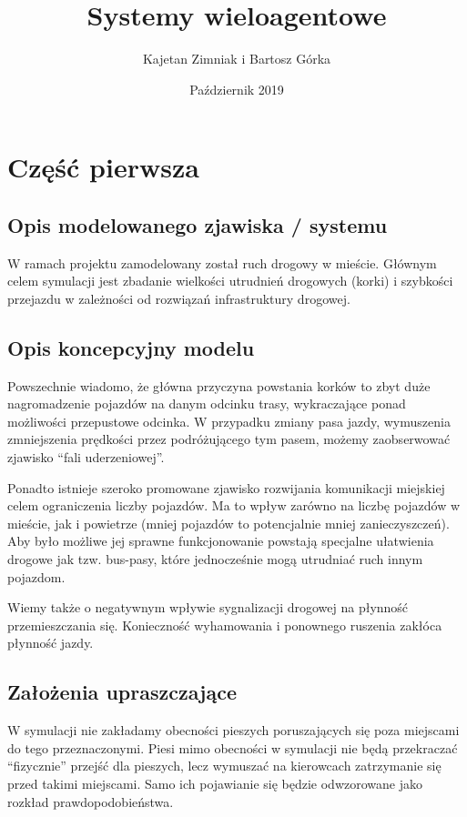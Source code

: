 \documentclass{article}
\title{Systemy wieloagentowe}
\author{Kajetan Zimniak i Bartosz Górka }
\date{Październik 2019}
\begin{document}
\maketitle

\section{Część pierwsza}
\subsection{Opis modelowanego zjawiska / systemu}
W ramach projektu zamodelowany został ruch drogowy w mieście. Głównym celem symulacji jest zbadanie wielkości utrudnień drogowych (korki) i szybkości przejazdu w zależności od rozwiązań infrastruktury drogowej.

\subsection{Opis koncepcyjny modelu}
Powszechnie wiadomo, że główna przyczyna powstania korków to zbyt duże nagromadzenie pojazdów na danym odcinku trasy, wykraczające ponad możliwości przepustowe odcinka. W przypadku zmiany pasa jazdy, wymuszenia zmniejszenia prędkości przez podróżującego tym pasem, możemy zaobserwować zjawisko ``fali uderzeniowej''.

Ponadto istnieje szeroko promowane zjawisko rozwijania komunikacji miejskiej celem ograniczenia liczby pojazdów. Ma to wpływ zarówno na liczbę pojazdów w mieście, jak i powietrze (mniej pojazdów to potencjalnie mniej zanieczyszczeń). Aby było możliwe jej sprawne funkcjonowanie powstają specjalne ułatwienia drogowe jak tzw. bus-pasy, które jednocześnie mogą utrudniać ruch innym pojazdom.

Wiemy także o negatywnym wpływie sygnalizacji drogowej na płynność przemieszczania się. Konieczność wyhamowania i ponownego ruszenia zakłóca płynność jazdy.

\subsection{Założenia upraszczające}
W symulacji nie zakładamy obecności pieszych poruszających się poza miejscami do tego przeznaczonymi. Piesi mimo obecności w symulacji nie będą przekraczać ``fizycznie'' przejść dla pieszych, lecz wymuszać na kierowcach zatrzymanie się przed takimi miejscami. Samo ich pojawianie się będzie odwzorowane jako rozkład prawdopodobieństwa.
\end{document}

